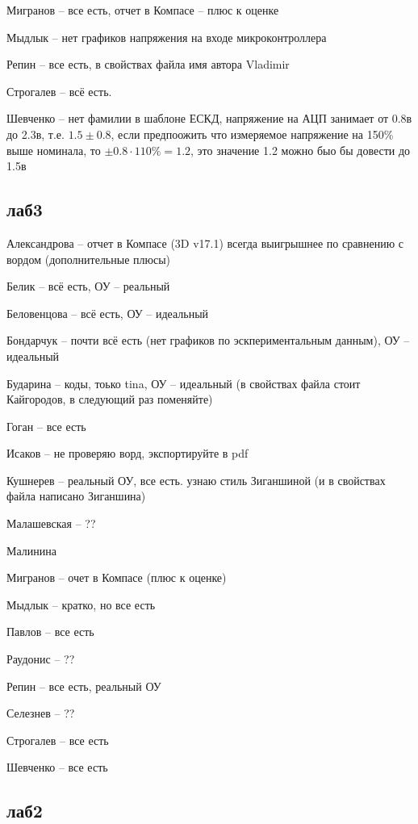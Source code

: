 \documentclass[a4paper,11pt]{article}
\begin{document}
Мигранов -- все есть, отчет в Компасе -- плюс к оценке

Мыдлык -- нет графиков напряжения на входе микроконтроллера

Репин -- все есть, в свойствах файла имя автора Vladimir

Строгалев -- всё есть.

Шевченко -- нет фамилии в шаблоне ЕСКД, напряжение на АЦП занимает от 0.8в до 2.3в, т.е. $1.5\pm0.8$, если предпоожить что измеряемое напряжение на 150\% выше
номинала, то $\pm0.8\cdot110\% = 1.2$, это значение 1.2 можно быо бы довести до 1.5в
\newpage
\subsection*{лаб3}
Александрова -- отчет в Компасе (3D v17.1) всегда выигрышнее по сравнению с вордом (дополнительные плюсы)

Белик -- всё есть, ОУ -- реальный

Беловенцова  -- всё есть, ОУ -- идеальный

Бондарчук -- почти всё есть (нет графиков по эскпериментальным данным), ОУ -- идеальный

Бударина -- коды, тоько tina, ОУ -- идеальный  (в свойствах файла стоит Кайгородов, в следующий раз поменяйте)

Гоган  -- все есть

Исаков -- не проверяю ворд, экспортируйте в pdf

Кушнерев -- реальный ОУ, все есть. узнаю стиль  Зиганшиной (и в свойствах файла написано Зиганшина)

Малашевская -- ?? %

Малинина 

Мигранов -- очет в Компасе (плюс к оценке)

Мыдлык -- кратко, но все есть

Павлов -- все есть

Раудонис -- ??

Репин -- все есть, реальный ОУ

Селезнев -- ?? %

Строгалев -- все есть 

Шевченко -- все есть

\newpage
\subsection*{лаб2}
\end{document}
